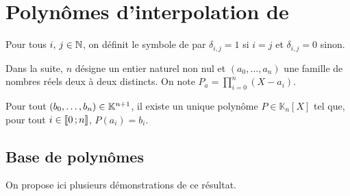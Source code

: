 \section{Polynômes d'interpolation de }

Pour tous $i,\, j \in \mathbb{N}$, on définit le symbole de  par $\delta_{i,j} = 1$ si $i = j$ et $\delta_{i,j} = 0$ sinon.

Dans la suite, $n$ désigne un entier naturel non nul et $(a_0, \ldots, a_n)$ une famille de nombres réels deux à deux distincts. On note $P_a = \prod\limits_{i=0}^n (X - a_i)$.

\begin{defi}
Pour tout $(b_0,\ldots,b_n) \in \mathbb{K}^{n+1}$, il existe un unique polynôme $P \in \mathbb{K}_n[X]$ tel que, pour tout $i \in \llbracket 0\,; n \rrbracket$, $P(a_i) = b_i$.
\end{defi}




\subsection{Base de polynômes}

On propose ici plusieurs démonstrations de ce résultat.

